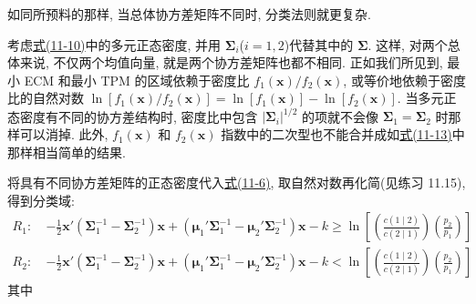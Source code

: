 如同所预料的那样, 当总体协方差矩阵不同时, 分类法则就更复杂.

考虑\hyperref[eq:11-10]{式(11-10)}中的多元正态密度, 并用 $\boldsymbol{\Sigma}_i$($i=1,2$)代替其中的 $\boldsymbol{\Sigma}$. 这样, 对两个总体来说, 不仅两个均值向量, 就是两个协方差矩阵也都不相同. 正如我们所见到, 最小 ECM 和最小 TPM 的区域依赖于密度比 $f_1(\mathbf{x})/f_2(\mathbf{x})$, 或等价地依赖于密度比的自然对数 $\ln[f_1(\mathbf{x})/f_2(\mathbf{x})]=\ln[f_1(\mathbf{x})]-\ln[f_2(\mathbf{x})]$. 当多元正态密度有不同的协方差结构时, 密度比中包含 $|\boldsymbol{\Sigma}_i|^{1/2}$ 的项就不会像 $\boldsymbol{\Sigma}_1=\boldsymbol{\Sigma}_2$ 时那样可以消掉. 此外, $f_1(\mathbf{x})$ 和 $f_2(\mathbf{x})$ 指数中的二次型也不能合并成如\hyperref[eq:11-13]{式(11-13)}中那样相当简单的结果.

将具有不同协方差矩阵的正态密度代入\hyperref[eq:11-6]{式(11-6)}, 取自然对数再化简(见练习 11.15), 得到分类域:
\label{eq:11-27}
\begin{equation}
\begin{aligned}
R_1:\ &-\frac{1}{2}\mathbf{x}'(\boldsymbol{\Sigma}_1^{-1}-\boldsymbol{\Sigma}_2^{-1})\mathbf{x}+(\boldsymbol{\mu}_1'\boldsymbol{\Sigma}_1^{-1}-\boldsymbol{\mu}_2'\boldsymbol{\Sigma}_2^{-1})\mathbf{x}-k\geqslant\ln\left[\left(\frac{c(1\mid2)}{c(2\mid1)}\right)\left(\frac{p_2}{p_1}\right)\right]\\
R_2:\ &-\frac{1}{2}\mathbf{x}'(\boldsymbol{\Sigma}_1^{-1}-\boldsymbol{\Sigma}_2^{-1})\mathbf{x}+(\boldsymbol{\mu}_1'\boldsymbol{\Sigma}_1^{-1}-\boldsymbol{\mu}_2'\boldsymbol{\Sigma}_2^{-1})\mathbf{x}-k<\ln\left[\left(\frac{c(1\mid2)}{c(2\mid1)}\right)\left(\frac{p_2}{p_1}\right)\right]
\end{aligned}
\tag{11-27}
\end{equation}
其中
